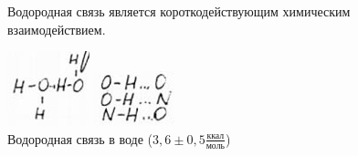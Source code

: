 \begin{lecture}
	\begin{lecSection}
	\begin{figure}[H]
	Водородная связь является короткодействующим химическим взаимодействием.
	\begin{minipage}[h]{0.2\linewidth}
		\centering\includegraphics[width=\linewidth]{lecture_07/pic2}
		\caption{Водородная связь в воде ($3,6 \pm 0,5 \frac{\text{ккал}}{\textbf{моль}}$)}
	\end{minipage}
	\hfill
	\begin{minipage}[h]{0.2\linewidth}
		\centering\includegraphics[width=\linewidth]{lecture_07/pic3}

\end{minipage}
\end{figure}
\end{lecSection}
\end{lecture}
